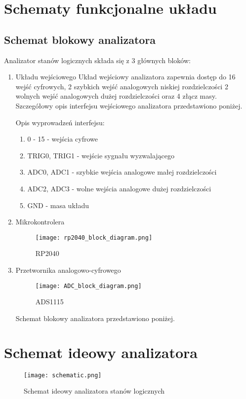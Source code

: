\section{Schematy funkcjonalne układu}

\subsection{Schemat blokowy analizatora}
Analizator stanów logicznych składa się z 3 głównych bloków:
\begin{enumerate}
    \item Układu wejściowego
Układ wejściowy analizatora zapewnia dostęp do 16 wejść cyfrowych,
2 szybkich wejść analogowych niskiej rozdzielczości 2 wolnych wejść
analogowych dużej rozdzielczości oraz 4 złącz masy. Szczegółowy opis 
interfejsu wejściowego analizatora przedstawiono poniżej.


Opis wyprowadzeń interfejsu:
\begin{enumerate}
    \item 0 - 15 - wejścia cyfrowe
    \item TRIG0, TRIG1 - wejście sygnału wyzwalającego
    \item ADC0, ADC1 - szybkie wejścia analogowe małej rozdzielczości
    \item ADC2, ADC3 - wolne wejścia analogowe dużej rozdzielczości
    \item GND - masa układu 
\end{enumerate} 

    \item Mikrokontrolera
    \begin{figure}[!ht]
        \centering
        \texttt{[image: rp2040\_block\_diagram.png]}
        \caption{RP2040}
        \label{fig:RP2040}
    \end{figure}

    \item Przetwornika analogowo-cyfrowego 
    \begin{figure}[!ht]
        \centering
        \texttt{[image: ADC\_block\_diagram.png]}
        \caption{ADS1115}
        \label{fig:ADS1115}
    \end{figure}

Schemat blokowy analizatora przedstawiono poniżej.

\end{enumerate}



\useNormalLandscape{}
\section{Schemat ideowy analizatora}
    \begin{figure}[!ht]
        \centering
        \texttt{[image: schematic.png]}
        \caption{Schemat ideowy analizatora stanów logicznych}
    \end{figure}
\usePortrait{}

